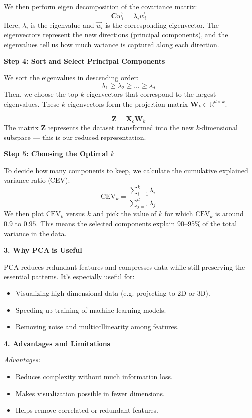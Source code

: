 \documentclass[12pt,a4paper]{article}
\begin{document}
We then perform eigen decomposition of the covariance matrix:
\[
\mathbf{C}\vec{w}_i = \lambda_i \vec{w}_i
\]
Here, $\lambda_i$ is the eigenvalue and $\vec{w}_i$ is the corresponding eigenvector. The eigenvectors represent the new directions (principal components), and the eigenvalues tell us how much variance is captured along each direction.

\textbf{Step 4: Sort and Select Principal Components}

We sort the eigenvalues in descending order:
\[
\lambda_1 \ge \lambda_2 \ge \ldots \ge \lambda_d
\]
Then, we choose the top $k$ eigenvectors that correspond to the largest eigenvalues. These $k$ eigenvectors form the projection matrix $\mathbf{W}_k \in \mathbb{R}^{d \times k}$.

\[
\mathbf{Z} = \mathbf{X}_c \mathbf{W}_k
\]
The matrix $\mathbf{Z}$ represents the dataset transformed into the new $k$-dimensional subspace — this is our reduced representation.

\textbf{Step 5: Choosing the Optimal $k$}

To decide how many components to keep, we calculate the cumulative explained variance ratio (CEV):
\[
\text{CEV}_k = \frac{\sum_{i=1}^{k}\lambda_i}{\sum_{j=1}^{d}\lambda_j}
\]
We then plot $\text{CEV}_k$ versus $k$ and pick the value of $k$ for which $\text{CEV}_k$ is around $0.9$ to $0.95$.  
This means the selected components explain 90–95\% of the total variance in the data.

\textbf{3. Why PCA is Useful}

PCA reduces redundant features and compresses data while still preserving the essential patterns. It’s especially useful for:
\begin{itemize}
    \item Visualizing high-dimensional data (e.g. projecting to 2D or 3D).
    \item Speeding up training of machine learning models.
    \item Removing noise and multicollinearity among features.
\end{itemize}

\textbf{4. Advantages and Limitations}

\textit{Advantages:}
\begin{itemize}
    \item Reduces complexity without much information loss.
    \item Makes visualization possible in fewer dimensions.
    \item Helps remove correlated or redundant features.
\end{itemize}
\end{document}
